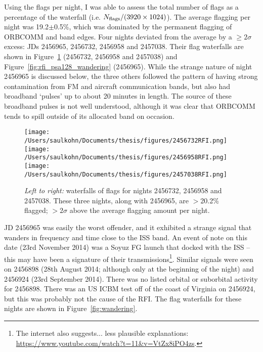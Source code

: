 Using the flags per night, I was able to assess the total number of flags as a percentage of the waterfall (i.e. $N_{\rm flags}/(3920\times1024)$). The average flagging per night was 19.2$\pm$0.5\%, which was dominated by the permanent flagging of ORBCOMM and band edges. Four nights deviated from the average by a $\geq 2\sigma$ excess: JDs 2456965, 2456732, 2456958 and 2457038. Their flag waterfalls are shown in Figure~\ref{fig:rfi_psa128_worst} (2456732, 2456958 and 2457038) and Figure~\ref{fig:rfi_psa128_wandering} (2456965). While the strange nature of night 2456965 is discussed below, the three others followed the pattern of having strong contamination from FM and aircraft communication bands, but also had broadband `pulses' up to about 20 minutes in length. The source of these broadband pulses is not well understood, although it was clear that ORBCOMM tends to spill outside of its allocated band on occasion.

\begin{figure}
\centering
\texttt{[image: /Users/saulkohn/Documents/thesis/figures/2456732RFI.png]}
\texttt{[image: /Users/saulkohn/Documents/thesis/figures/2456958RFI.png]}
\texttt{[image: /Users/saulkohn/Documents/thesis/figures/2457038RFI.png]}
\caption[Waterfalls of RFI flags for nights 2456732, 2456958 and 2457038.]{\textit{Left to right:} waterfalls of flags for nights 2456732, 2456958 and 2457038. These three nights, along with 2456965, are $>$20.2\% flagged; $>2\sigma$ above the average flagging amount per night.}
\label{fig:rfi_psa128_worst}
\end{figure}


JD 2456965 was easily the worst offender, and it exhibited a strange signal that wanders in frequency and time close to the ISS band. An event of note on this date (23rd November 2014) was a Soyuz FG launch that docked with the ISS -- this may have been a signature of their transmissions\footnote{The internet also suggests... less plausible explanations: \url{https://www.youtube.com/watch?t=11&v=VtZx8iPO4zs}. }.
Similar signals were seen on 2456898 (28th August 2014; although only at the beginning of the night) and 2456924 (23rd September 2014). There was no listed orbital or suborbital activity for 2456898. There was an US ICBM test off of the coast of Virginia on 2456924, but this was probably not the cause of the RFI. The flag waterfalls for these nights are shown in Figure~\ref{fig:wandering}.\\

